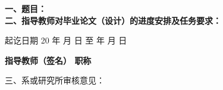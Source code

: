 \clearpage
{}

{
    \bfseries
    \noindent 一、题目：\\
    \noindent 二、指导教师对毕业论文（设计）的进度安排及任务要求：\\

    \vskip 50mm

    \noindent 起讫日期 20 \quad 年 \quad  月 \quad  日 \quad 至  \quad  年 \quad  月  \quad 日
    \begin{flushright}
        \bfseries {}
            指导教师（签名） \underline{} 职称 \underline{}
    \end{flushright}

    \noindent 三、系或研究所审核意见：\\

    \mbox{} \vfill
    \signature{负责人（签名）}
}
